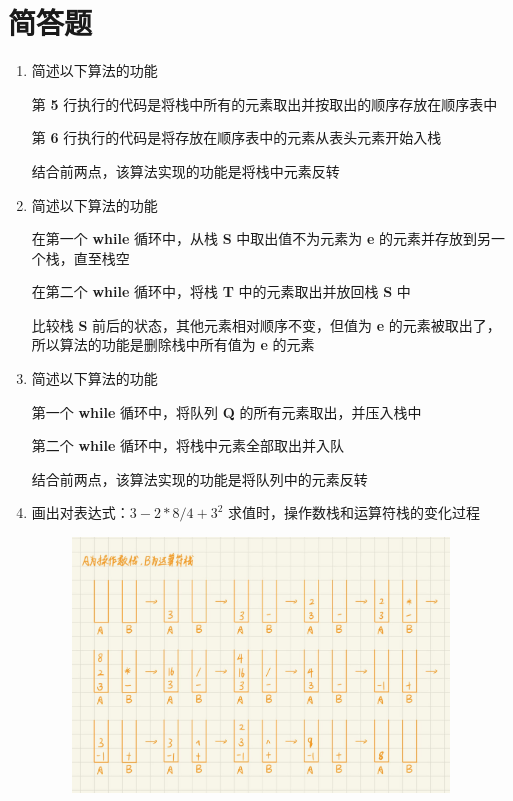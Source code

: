 \section{简答题}
    \begin{enumerate}
        \item 简述以下算法的功能
            
            \begin{mquote}
                \par 第 \textbf{5} 行执行的代码是将栈中所有的元素取出并按取出的顺序存放在顺序表中
                \par 第 \textbf{6} 行执行的代码是将存放在顺序表中的元素从表头元素开始入栈
                \par 结合前两点，该算法实现的功能是将栈中元素反转
            \end{mquote}
        \item 简述以下算法的功能
            
            \begin{mquote}
                \par 在第一个 \textbf{while} 循环中，从栈 \textbf{S} 中取出值不为元素为 \textbf{e} 的元素并存放到另一个栈，直至栈空
                \par 在第二个 \textbf{while} 循环中，将栈 \textbf{T} 中的元素取出并放回栈 \textbf{S} 中
                \par 比较栈 \textbf{S} 前后的状态，其他元素相对顺序不变，但值为 \textbf{e} 的元素被取出了，所以算法的功能是删除栈中所有值为 \textbf{e} 的元素
            \end{mquote}
        \item 简述以下算法的功能
            
            \begin{mquote}
                \par 第一个 \textbf{while} 循环中，将队列 \textbf{Q} 的所有元素取出，并压入栈中
                \par 第二个 \textbf{while} 循环中，将栈中元素全部取出并入队
                \par 结合前两点，该算法实现的功能是将队列中的元素反转
            \end{mquote}
        \newpage
        \item 画出对表达式：$3 - 2 * 8 / 4 + 3^2$ 求值时，操作数栈和运算符栈的变化过程
            \begin{figure}[htbp]
                \centering
                \includegraphics*[width = 10cm]{operator.jpg}

\end{figure}
\end{enumerate}
